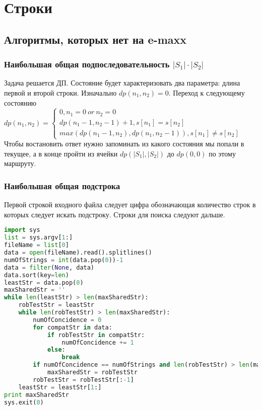 \chapter{Строки}
\section{Алгоритмы, которых нет на e-maxx}
\subsection{Наибольшая общая подпоследовательность $|S_1| \cdot |S_2|$}
Задача решается ДП. Состояние будет характеризовать два параметра: длина первой и второй строки. Изначально $dp(n_1,n_2) = 0$. Переход к следующему состоянию \newline
$dp(n_1, n_2) = \left \{ 
\begin{array}{ll}
 0, n_1 = 0\ or\ n_2 = 0 \\
 dp(n_1 - 1, n_2 - 1) + 1,  s[n_1] = s[n_2] \\
 max(dp(n_1 - 1, n_2), dp(n_1, n_2 - 1)),  s[n_1] \neq s[n_2]
 \end{array}
 \right.$
 Чтобы востановить ответ нужно запоминать из какого состояния мы попали в текущее, а в конце пройти из ячейки $dp(|S_1|,|S_2|)$ до $dp(0,0)$ по этому маршруту.
 \subsection{Наибольшая общая подстрока}
 Первой строкой входного файла следует цифра обозначающая количество строк в которых следует искать подстроку. Строки для поиска следуют дальше.
\begin{lstlisting}[language = Python]
import sys
list = sys.argv[1:]
fileName = list[0]
data = open(fileName).read().splitlines()
numOfStrings = int(data.pop(0))-1
data = filter(None, data)
data.sort(key=len)
leastStr = data.pop(0)
maxSharedStr = ''
while len(leastStr) > len(maxSharedStr):
    robTestStr = leastStr
    while len(robTestStr) > len(maxSharedStr):
        numOfConcidence = 0
        for compatStr in data:
            if robTestStr in compatStr:
                numOfConcidence += 1
            else:
                break
        if numOfConcidence == numOfStrings and len(robTestStr) > len(maxSharedStr):
            maxSharedStr = robTestStr
        robTestStr = robTestStr[:-1]
    leastStr = leastStr[1:]
print maxSharedStr
sys.exit(0)
\end{lstlisting}
